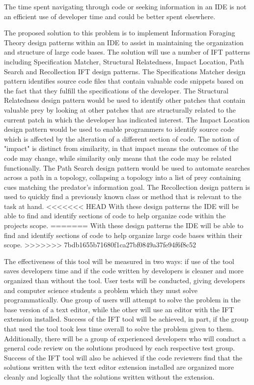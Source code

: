 \documentclass[letterpaper,10pt,titlepage,draftclsnofoot,onecolumn] {IEEEtran}
\begin{document}
\bigskip
The time spent navigating through code or seeking information in an IDE is not an efficient use of developer time and could be better spent elsewhere.

\bigskip
The proposed solution to this problem is to implement Information Foraging Theory design patterns within an IDE to assist in maintaining the organization and structure of large code bases.
The solution will use a number of IFT patterns including Specification Matcher, Structural Relatedness, Impact Location, Path Search and Recollection IFT design patterns.
The Specifications Matcher design pattern identifies source code files that contain valuable code snippets based on the fact that they fulfill the specifications of the developer. 
The Structural Relatedness design pattern would be used to identify other patches that contain valuable prey by looking at other patches that are structurally related to the current patch in which the developer has indicated interest.
The Impact Location design pattern would be used to enable programmers to identify source code which is affected by the alteration of a different section of code. 
The notion of "impact" is distinct from similarity, in that impact means the outcomes of the code may change, while similarity only means that the code may be related functionally. 
The Path Search design pattern would be used to automate searches across a path in a topology, collapsing a topology into a list of prey containing cues matching the predator's information goal. 
The Recollection design pattern is used to quickly find a previously known class or method that is relevant to the task at hand.
<<<<<<< HEAD
With these design patterns the IDE will be able to find and identify sections of code to help organize code within the projects scope. \cite{iftwiki}
=======
With these design patterns the IDE will be able to find and identify sections of code to help organize large code bases within their scope.
>>>>>>> 7bdb1655b71680f1ca27bf0849a37fe94f6f8c52

\bigskip
The effectiveness of this tool will be measured in two ways: if use of the tool saves developers time and if the code written by developers is cleaner and more organized than without the tool. 
User tests will be conducted, giving developers and computer science students a problem which they must solve programmatically. 
One group of users will attempt to solve the problem in the base version of a text editor, while the other will use an editor with the IFT extension installed. 
Success of the IFT tool will be achieved, in part, if the group that used the tool took less time overall to solve the problem given to them. 
Additionally, there will be a group of experienced developers who will conduct a general code review on the solutions produced by each respective test group. 
Success of the IFT tool will also be achieved if the code reviewers find that the solutions written with the text editor extension installed are organized more cleanly and logically that the solutions written without the extension. 



\end{document}
